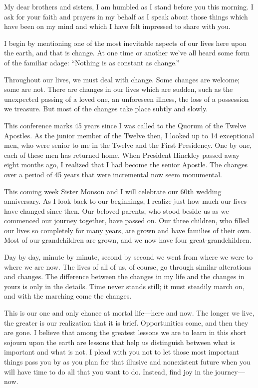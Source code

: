 \documentclass[letterpaper, 11pt]{report}
\newcommand{\speaker}{}
\newcommand{\talk}{}
\newcommand{\setspeaker}[1]{\renewcommand{\speaker}{#1}}
\newcommand{\settalk}[1]{\renewcommand{\talk}{#1}}
\newcommand{\talkheading}[2]{%
    \vspace{1em}
    \noindent{\huge\bfseries #1}
    \par\vspace{0.25em}
    \noindent{\normalsize\bfseries #2}
    \par\vspace{0.5em}
}
\begin{document}
\newpage
\settalk{Finding Joy In The Journey}
\setspeaker{Thomas S. Monson}
\talkheading{Finding Joy In The Journey}{Thomas S. Monson}

My dear brothers and sisters, I am humbled as I stand before you this morning. I ask for your faith and prayers in my behalf as I speak about those things which have been on my mind and which I have felt impressed to share with you.

I begin by mentioning one of the most inevitable aspects of our lives here upon the earth, and that is change. At one time or another we’ve all heard some form of the familiar adage: “Nothing is as constant as change.”

Throughout our lives, we must deal with change. Some changes are welcome; some are not. There are changes in our lives which are sudden, such as the unexpected passing of a loved one, an unforeseen illness, the loss of a possession we treasure. But most of the changes take place subtly and slowly.

This conference marks 45 years since I was called to the Quorum of the Twelve Apostles. As the junior member of the Twelve then, I looked up to 14 exceptional men, who were senior to me in the Twelve and the First Presidency. One by one, each of these men has returned home. When President Hinckley passed away eight months ago, I realized that I had become the senior Apostle. The changes over a period of 45 years that were incremental now seem monumental.

This coming week Sister Monson and I will celebrate our 60th wedding anniversary. As I look back to our beginnings, I realize just how much our lives have changed since then. Our beloved parents, who stood beside us as we commenced our journey together, have passed on. Our three children, who filled our lives so completely for many years, are grown and have families of their own. Most of our grandchildren are grown, and we now have four great-grandchildren.

Day by day, minute by minute, second by second we went from where we were to where we are now. The lives of all of us, of course, go through similar alterations and changes. The difference between the changes in my life and the changes in yours is only in the details. Time never stands still; it must steadily march on, and with the marching come the changes.

This is our one and only chance at mortal life—here and now. The longer we live, the greater is our realization that it is brief. Opportunities come, and then they are gone. I believe that among the greatest lessons we are to learn in this short sojourn upon the earth are lessons that help us distinguish between what is important and what is not. I plead with you not to let those most important things pass you by as you plan for that illusive and nonexistent future when you will have time to do all that you want to do. Instead, find joy in the journey—now.
\end{document}
